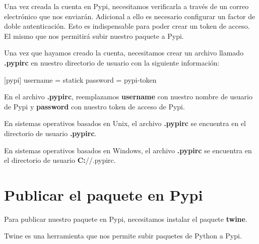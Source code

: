 \documentclass[
  a4paper,
  DIV=11,
  numbers=noendperiod,
  onepage,
  openany]{scrreprt}
\newenvironment{Shaded}{\begin{snugshade}}{\end{snugshade}}
\newcommand{\NormalTok}[1]{\textcolor[rgb]{0.00,0.23,0.31}{#1}}
\begin{document}
\begin{tcolorbox}
\begin{tcolorbox}
Una vez creada la cuenta en Pypi, necesitamos verificarla a través de un
correo electrónico que nos enviarán. Adicional a ello es necesario
configurar un factor de doble autenticación. Esto es indispensable para
poder crear un token de acceso. El mismo que nos permitirá subir nuestro
paquete a Pypi.

\end{tcolorbox}

Una vez que hayamos creado la cuenta, necesitamos crear un archivo
llamado \textbf{.pypirc} en nuestro directorio de usuario con la
siguiente información:

\begin{Shaded}
\begin{Highlighting}[]
\NormalTok{[pypi]}
\NormalTok{  username = statick}
\NormalTok{  password = pypi{-}token}
\end{Highlighting}
\end{Shaded}

En el archivo \textbf{.pypirc}, reemplazamos \textbf{username} con
nuestro nombre de usuario de Pypi y \textbf{password} con nuestro token
de acceso de Pypi.

\begin{tcolorbox}[enhanced jigsaw, bottomrule=.15mm, title=\textcolor{quarto-callout-tip-color}{\faLightbulb}\hspace{0.5em}{Tip}, coltitle=black, leftrule=.75mm, left=2mm, colbacktitle=quarto-callout-tip-color!10!white, breakable, colframe=quarto-callout-tip-color-frame, colback=white, opacitybacktitle=0.6, opacityback=0, bottomtitle=1mm, toptitle=1mm, toprule=.15mm, arc=.35mm, titlerule=0mm, rightrule=.15mm]

En sistemas operativos basados en Unix, el archivo \textbf{.pypirc} se
encuentra en el directorio de usuario \textbf{.pypirc}.

En sistemas operativos basados en Windows, el archivo \textbf{.pypirc}
se encuentra en el directorio de usuario
\textbf{C:}/\Users/\username.pypirc.

\end{tcolorbox}

\chapter{Publicar el paquete en Pypi}\label{publicar-el-paquete-en-pypi}

Para publicar nuestro paquete en Pypi, necesitamos instalar el paquete
\textbf{twine}.

Twine es una herramienta que nos permite subir paquetes de Python a
Pypi.


\end{tcolorbox}
\end{document}

